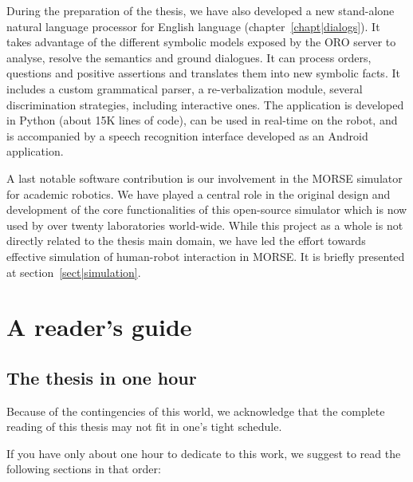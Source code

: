 During the preparation of the thesis, we have also developed a new stand-alone
natural language processor for English language (chapter~\ref{chapt|dialogs}).
It takes advantage of the different symbolic models exposed by the ORO server
to analyse, resolve the semantics and ground dialogues. It can process orders,
questions and positive assertions and translates them into new symbolic facts.
It includes a custom grammatical parser, a re-verbalization module, several
discrimination strategies, including interactive ones. The application is
developed in Python (about 15K lines of code), can be used in real-time on the
robot, and is accompanied by a speech recognition interface developed as an
Android application.

A last notable software contribution is our involvement in the MORSE simulator
for academic robotics. We have played a central role in the original design and
development of the core functionalities of this open-source simulator which is
now used by over twenty laboratories world-wide. While this project as a whole
is not directly related to the thesis main domain, we have led the effort
towards effective simulation of human-robot interaction in MORSE. It is briefly
presented at section~\ref{sect|simulation}.




\section{A reader's guide}

\subsection*{The thesis in one hour}

Because of the contingencies of this world, we acknowledge that the complete
reading of this thesis may not fit in one's tight schedule.

If you have only about one hour to dedicate to this work, we suggest to read
the following sections in that order:

